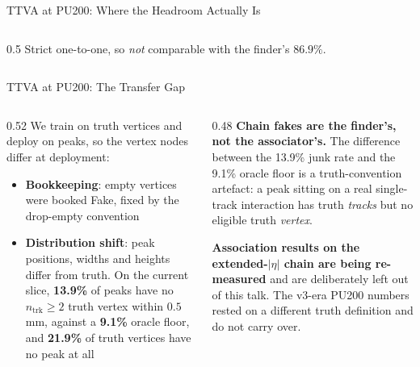\documentclass[xcolor=table,aspectratio=169]{beamer}
\newcommand{\ntrk}{\ensuremath{n_\mathrm{trk}}}
\begin{document}
\begin{frame}{TTVA at PU200: Where the Headroom Actually Is}
\begin{columns}[c]
\begin{column}{0.5\linewidth}
            {\scriptsize\textcolor{black!55}{Strict one-to-one, so \emph{not}
            comparable with the finder's $86.9\%$.}}
        \end{column}
    \end{columns}
\end{frame}

\begin{frame}{TTVA at PU200: The Transfer Gap}
    \small
    \begin{columns}[t]
        \begin{column}{0.52\linewidth}
            We train on truth vertices and deploy on peaks, so the vertex nodes differ
            at deployment:
            \begin{itemize}
                \setlength\itemsep{0.35em}
                \item \textbf{Bookkeeping}: empty vertices were booked Fake, fixed by
                    the drop-empty convention
                \item \textbf{Distribution shift}: peak positions, widths and heights
                    differ from truth. On the current slice, \textbf{13.9\%} of peaks
                    have no $\ntrk\geq2$ truth vertex within $0.5$\,mm, against a
                    \textbf{9.1\%} oracle floor, and \textbf{21.9\%} of truth vertices
                    have no peak at all
            \end{itemize}
        \end{column}
        \begin{column}{0.48\linewidth}
            \textbf{Chain fakes are the finder's, not the associator's.} The
            difference between the 13.9\% junk rate and the 9.1\% oracle floor is a
            truth-convention artefact: a peak sitting on a real single-track
            interaction has truth \emph{tracks} but no eligible truth \emph{vertex}.
            \vspace{0.5em}

            \setlength{\fboxsep}{5pt}
            \colorbox{pennred!8}{\parbox{0.95\linewidth}{%
            \textcolor{pennred}{\textbf{Association results on the extended-$|\eta|$
            chain are being re-measured} and are deliberately left out of this talk.}
            The v3-era PU200 numbers rested on a different truth definition and do not
            carry over.}}
        \end{column}
    \end{columns}
\end{frame}
\end{document}
